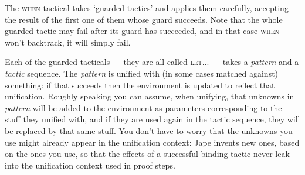 The \textsc{when} tactical takes `guarded tactics' and applies them carefully, accepting the result of the first one of them whose guard succeeds. Note that the whole guarded tactic may fail after its guard has succeeded, and in that case \textsc{when} won't backtrack, it will simply fail.


Each of the guarded tacticals --- they are all called \textsc{let...} --- takes a \textit{pattern} and a \textit{tactic} sequence. The \textit{pattern} is unified with (in some cases matched against) something: if that succeeds then the environment is updated to reflect that unification. Roughly speaking you can assume, when unifying, that unknowns in \textit{pattern} will be added to the environment as parameters corresponding to the stuff they unified with, and if they are used again in the tactic sequence, they will be replaced by that same stuff. You don't have to worry that the unknowns you use might already appear in the unification context: Jape invents new ones, based on the ones you use, so that the effects of a successful binding tactic never leak into the unification context used in proof steps.

 